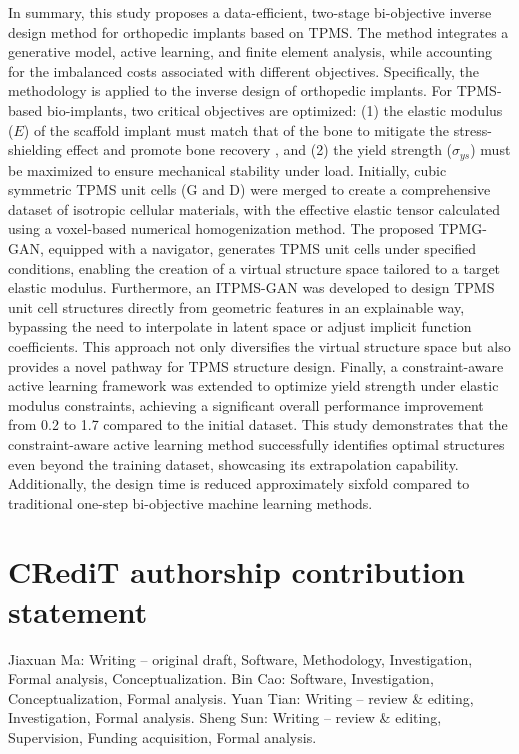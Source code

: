 \documentclass[preprint,review,12pt,authoryear]{elsarticle}
\begin{document}
In summary, this study proposes a data-efficient, two-stage bi-objective inverse design method for orthopedic implants based on TPMS. The method integrates a generative model, active learning, and finite element analysis, while accounting for the imbalanced costs associated with different objectives. Specifically, the methodology is applied to the inverse design of orthopedic implants. For TPMS-based bio-implants, two critical objectives are optimized: (1) the elastic modulus ($E$) of the scaffold implant must match that of the bone to mitigate the stress-shielding effect and promote bone recovery , and (2) the yield strength ($\sigma_{ys}$) must be maximized to ensure mechanical stability under load. Initially, cubic symmetric TPMS unit cells (G and D) were merged to create a comprehensive dataset of isotropic cellular materials, with the effective elastic tensor calculated using a voxel-based numerical homogenization method. The proposed TPMG-GAN, equipped with a navigator, generates TPMS unit cells under specified conditions, enabling the creation of a virtual structure space tailored to a target elastic modulus. Furthermore, an ITPMS-GAN was developed to design TPMS unit cell structures directly from geometric features in an explainable way, bypassing the need to interpolate in latent space or adjust implicit function coefficients. This approach not only diversifies the virtual structure space but also provides a novel pathway for TPMS structure design. Finally, a constraint-aware active learning framework was extended to optimize yield strength under elastic modulus constraints, achieving a significant overall performance improvement from 0.2 to 1.7 compared to the initial dataset. This study demonstrates that the constraint-aware active learning method successfully identifies optimal structures even beyond the training dataset, showcasing its extrapolation capability. Additionally, the design time is reduced approximately sixfold compared to traditional one-step bi-objective machine learning methods.


\section*{CRediT authorship contribution statement}
Jiaxuan Ma: Writing – original draft, Software, Methodology, Investigation, Formal analysis, Conceptualization. Bin Cao: Software, Investigation, Conceptualization, Formal analysis. Yuan Tian: Writing – review \& editing, Investigation, Formal analysis. Sheng Sun: Writing – review \& editing, Supervision, Funding acquisition, Formal analysis.
\end{document}
